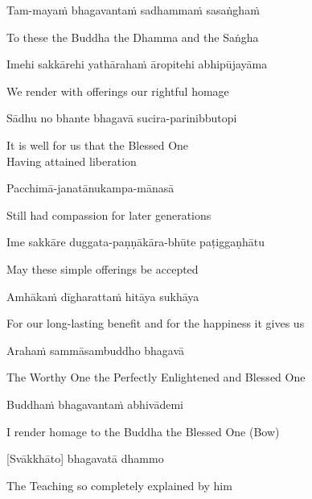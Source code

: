 Tam-mayaṁ bhagavantaṁ sadhammaṁ sasaṅghaṁ

\begin{english}
  To these the Buddha the Dhamma and the Saṅgha
\end{english}

Imehi sakkārehi yathārahaṁ āropitehi abhipūjayāma

\begin{english}
  We render with offerings our rightful homage
\end{english}

Sādhu no bhante bhagavā sucira-parinibbutopi

\begin{english}
  It is well for us that the Blessed One\\
  Having attained liberation
\end{english}

Pacchimā-janatānukampa-mānasā

\begin{english}
  Still had compassion for later generations
\end{english}

Ime sakkāre duggata-paṇṇākāra-bhūte paṭiggaṇhātu

\begin{english}
  May these simple offerings be accepted
\end{english}

Amhākaṁ dīgharattaṁ hitāya sukhāya

\begin{english}
  For our long-lasting benefit and for the happiness it gives us
\end{english}

\clearpage

Arahaṁ sammāsambuddho bhagavā

\begin{english}
  The Worthy One the Perfectly Enlightened and Blessed One
\end{english}

Buddhaṁ bhagavantaṁ abhivādemi\relax

\begin{english}
  I render homage to the Buddha the Blessed One \hfill{(Bow)}
\end{english}

[Svākkhāto] bhagavatā dhammo

\begin{english}
  The Teaching so completely explained by him
\end{english}

